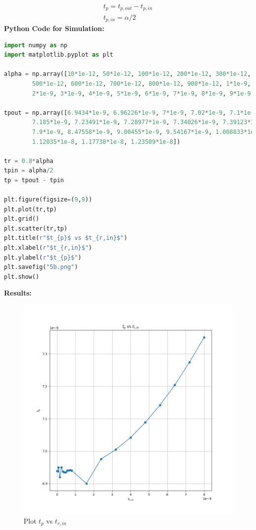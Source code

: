 \documentclass{article}
\begin{document}
\begin{align}
    t_p = t_{p,out} - t_{p,in} \\
    t_{p,in} = \alpha/2
\end{align}
\textbf{Python Code for Simulation:}
\begin{lstlisting}[language=Python]
import numpy as np
import matplotlib.pyplot as plt

alpha = np.array([10*1e-12, 50*1e-12, 100*1e-12, 200*1e-12, 300*1e-12, 400*1e-12, 
		500*1e-12, 600*1e-12, 700*1e-12, 800*1e-12, 900*1e-12, 1*1e-9,
		2*1e-9, 3*1e-9, 4*1e-9, 5*1e-9, 6*1e-9, 7*1e-9, 8*1e-9, 9*1e-9, 10*1e-9])
		
tpout = np.array([6.9434*1e-9, 6.96226*1e-9, 7*1e-9, 7.02*1e-9, 7.1*1e-9, 7.137*1e-9,
        7.185*1e-9, 7.23491*1e-9, 7.28977*1e-9, 7.34026*1e-9, 7.39123*1e-9, 7.44*1e-9, 
        7.9*1e-9, 8.47558*1e-9, 9.00455*1e-9, 9.54167*1e-9, 1.008833*1e-8, 1.06419*1e-8, 
		1.12035*1e-8, 1.17738*1e-8, 1.23509*1e-8])

tr = 0.8*alpha
tpin = alpha/2
tp = tpout - tpin
		
plt.figure(figsize=(9,9))
plt.plot(tr,tp)
plt.grid()
plt.scatter(tr,tp)
plt.title(r"$t_{p}$ vs $t_{r,in}$")
plt.xlabel(r"$t_{r,in}$")
plt.ylabel(r"$t_{p}$")
plt.savefig("5b.png")
plt.show()
\end{lstlisting}
\textbf{Results:}
\begin{figure}[!ht]
    \centering
    \includegraphics[scale=0.45]{Images/5b.png}
    \caption{Plot $t_{p}$ vs $t_{r,in}$}
\end{figure}
\end{document}
